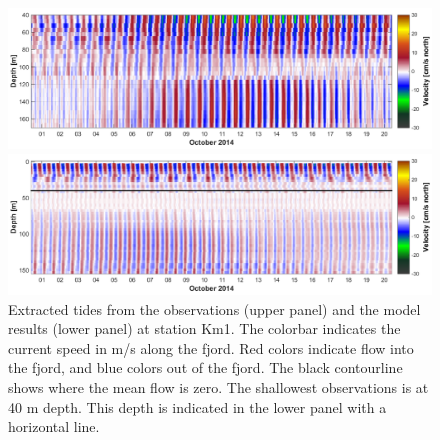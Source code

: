 \begin{figure}[htb]
	\centerline{ \includegraphics*[trim=0 0 0 0,clip=true,width=\textwidth]{Figurer/Filtvedt_obs_tide} }
	\centerline{ \includegraphics*[trim=0 0 0 0,clip=true,width=\textwidth]{Figurer/Filtvedt_sim_tide} }
	\caption{\small Extracted tides from the observations (upper panel) and the model results (lower panel) at station Km1. The colorbar indicates the current speed in m/s along the fjord. Red colors indicate flow into the fjord, and blue colors out of the fjord. The black contourline shows where the mean flow is zero. The shallowest observations is at 40 m depth. This depth is indicated in the lower panel with a horizontal line.} %
	\label{fig:Filtvedt-tide}
\end{figure}

